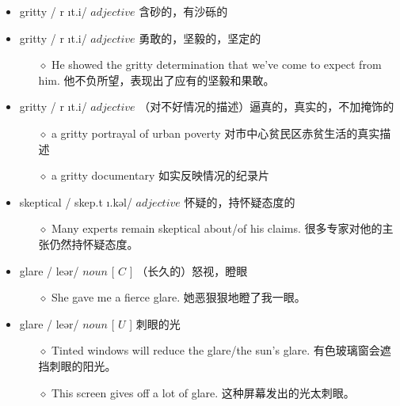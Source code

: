 \documentclass[a4paper,top=2.5cm,buttom=2.5cm10.5pt]{book}
\begin{document}
\begin{itemize}
\item gritty / \textprimstress  \textscriptg r \i t.i/ $ adjective $  含砂的，有沙砾的
\end{itemize}
\begin{itemize}
\item gritty / \textprimstress  \textscriptg r \i t.i/ $ adjective $  勇敢的，坚毅的，坚定的
\begin{itemize}
\item[$\diamond$] He showed the gritty determination that we've come to expect from him.
他不负所望，表现出了应有的坚毅和果敢。
\end{itemize}
\end{itemize}
\begin{itemize}
\item gritty / \textprimstress  \textscriptg r \i t.i/ $ adjective $  （对不好情况的描述）逼真的，真实的，不加掩饰的
\begin{itemize}
\item[$\diamond$] a gritty portrayal of urban poverty
对市中心贫民区赤贫生活的真实描述
\item[$\diamond$] a gritty documentary
如实反映情况的纪录片
\end{itemize}
\end{itemize}
\begin{itemize}
\item skeptical / \textprimstress skep.t \i .kəl/ $ adjective $  怀疑的，持怀疑态度的
\begin{itemize}
\item[$\diamond$] Many experts remain skeptical about/of his claims.
很多专家对他的主张仍然持怀疑态度。
\end{itemize}
\end{itemize}
\begin{itemize}
\item glare / \textscriptg leər/ $ noun $ [  $ C $  ] （长久的）怒视，瞪眼
\begin{itemize}
\item[$\diamond$] She gave me a fierce glare.
她恶狠狠地瞪了我一眼。
\end{itemize}
\end{itemize}
\begin{itemize}
\item glare / \textscriptg leər/ $ noun $ [  $ U $  ] 刺眼的光
\begin{itemize}
\item[$\diamond$] Tinted windows will reduce the glare/the sun's glare.
有色玻璃窗会遮挡刺眼的阳光。
\item[$\diamond$] This screen gives off a lot of glare.
这种屏幕发出的光太刺眼。
\end{itemize}
\end{itemize}
\end{document}
